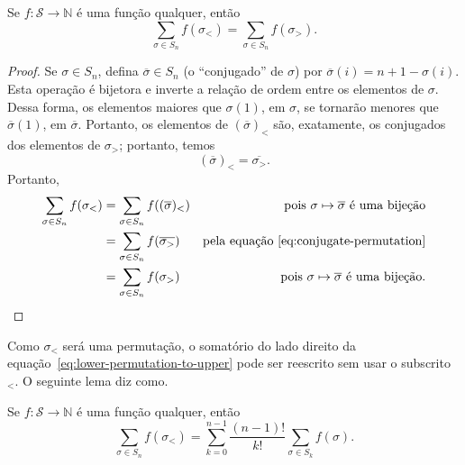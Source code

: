\begin{lemma}
    Se $f: \mathcal S \to \mathbb N$ é uma função qualquer,
    então
    \begin{equation}
        \sum_{\sigma \in S_n} f(\sigma_<) = \sum_{\sigma \in S_n} f(\sigma_>).
        \label{eq:lower-permutation-to-upper}
    \end{equation}
\end{lemma}

\begin{proof}
    Se $\sigma \in S_n$,
    defina $\overline \sigma \in S_n$
    (o ``conjugado'' de $\sigma$)
    por $\overline \sigma(i) = n + 1 - \sigma(i)$.
    Esta operação é bijetora
    e inverte a relação de ordem entre os elementos de $\sigma$.
    Dessa forma, os elementos maiores que $\sigma(1)$, em $\sigma$,
    se tornarão menores que $\overline \sigma(1)$, em $\overline \sigma$.
    Portanto,
    os elementos de $(\overline \sigma)_<$ são,
    exatamente,
    os conjugados dos elementos de $\sigma_>$;
    portanto, temos
    \begin{equation}
        (\overline \sigma)_< = \overline{\sigma_>}.
        \label{eq:conjugate-permutation}
    \end{equation}
    Portanto,
    \begin{align*}
        \sum_{\sigma \in S_n} f(\sigma_<) &= \sum_{\sigma \in S_n} f((\overline \sigma)_<)
        &\text{pois $\sigma \mapsto \overline \sigma$ é uma bijeção} \\
        &= \sum_{\sigma \in S_n} f(\overline{\sigma_>})
        &\text{pela equação~\ref{eq:conjugate-permutation}} \\
        &= \sum_{\sigma \in S_n} f(\sigma_>)
        &\text{pois $\sigma \mapsto \overline \sigma$ é uma bijeção.}
    \end{align*}
\end{proof}

Como $\sigma_<$ será uma permutação,
o somatório do lado direito da equação~\ref{eq:lower-permutation-to-upper}
pode ser reescrito sem usar o subscrito ${}_<$.
O seguinte lema diz como.

\begin{lemma}
    Se $f: \mathcal S \to \mathbb N$ é uma função qualquer,
    então
    \begin{equation}
        \sum_{\sigma \in S_n} f(\sigma_<)
            = \sum_{k = 0}^{n-1} \frac{(n-1)!}{k!} \sum_{\sigma \in S_k} f(\sigma).
        \label{eq:sum-partitions}
    \end{equation}
\end{lemma}

